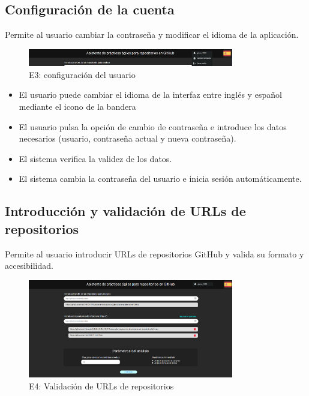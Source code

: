 \newpage
\subsection{Configuración de la cuenta}

Permite al usuario cambiar la contraseña y modificar el idioma de la aplicación.

\begin{figure}[H]
\centering
\includegraphics[width=0.8\textwidth]{img/E3-user-configuration.png}
\caption{E3: configuración del usuario}
\label{fig:E3-user-configuration}
\end{figure}

\begin{itemize}
    \item El usuario puede cambiar el idioma de la interfaz entre inglés y español mediante el icono de la bandera
    \item El usuario pulsa la opción de cambio de contraseña e introduce los datos necesarios (usuario, contraseña actual y nueva contraseña).
    \item El sistema verifica la validez de los datos.
    \item El sistema cambia la contraseña del usuario e inicia sesión automáticamente.
\end{itemize}

\newpage
\subsection{Introducción y validación de URLs de repositorios}

Permite al usuario introducir URLs de repositorios GitHub y valida su formato y accesibilidad.

\begin{figure}[H]
\centering
\includegraphics[width=0.8\textwidth]{img/E4-urls.png}
\caption{E4: Validación de URLs de repositorios}
\label{fig:E4-urls}
\end{figure}

